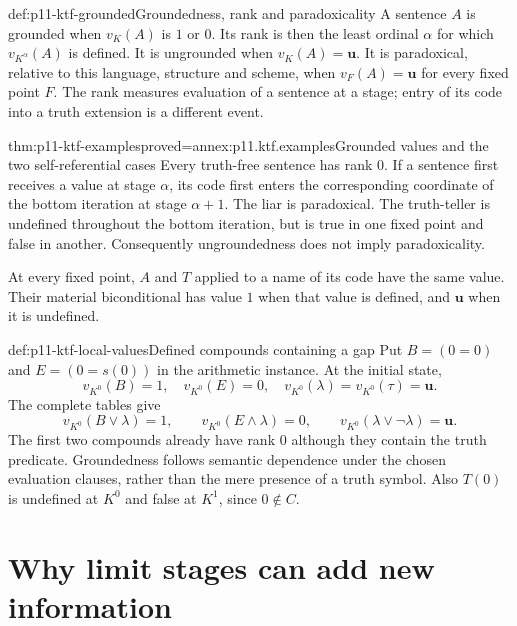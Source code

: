 \begin{hbdefinition}{def:p11-ktf-grounded}{Groundedness, rank and paradoxicality}
A sentence \(A\) is grounded when \(v_K(A)\) is \(1\) or \(0\).
Its rank is then the least ordinal \(\alpha\) for which
\(v_{K^\alpha}(A)\) is defined. It is ungrounded when
\(v_K(A)=\mathbf u\). It is paradoxical, relative to this language,
structure and scheme, when \(v_F(A)=\mathbf u\) for every fixed point
\(F\). The rank measures evaluation of a sentence at a stage; entry of
its code into a truth extension is a different event.
\end{hbdefinition}

\begin{hbtheorem}{thm:p11-ktf-examples}{proved=annex:p11.ktf.examples}{Grounded values and the two self-referential cases}
Every truth-free sentence has rank \(0\). If a sentence first receives a
value at stage \(\alpha\), its code first enters the corresponding
coordinate of the bottom iteration at stage \(\alpha+1\).
The liar is paradoxical. The truth-teller is undefined throughout the
bottom iteration, but is true in one fixed point and false in another.
Consequently ungroundedness does not imply paradoxicality.

At every fixed point, \(A\) and \(T\) applied to a name of its code
have the same value. Their material biconditional has value \(1\) when
that value is defined, and \(\mathbf u\) when it is undefined.
\end{hbtheorem}

\begin{hbexample}{def:p11-ktf-local-values}{Defined compounds containing a gap}
Put \(B=(0=0)\) and \(E=(0=s(0))\) in the arithmetic instance.
At the initial state,
\[
 v_{K^0}(B)=1,\quad v_{K^0}(E)=0,\quad
 v_{K^0}(\lambda)=v_{K^0}(\tau)=\mathbf u.
\]
The complete tables give
\[
 v_{K^0}(B\lor\lambda)=1,\qquad
 v_{K^0}(E\land\lambda)=0,\qquad
 v_{K^0}(\lambda\lor\neg\lambda)=\mathbf u.
\]
The first two compounds already have rank \(0\) although they contain
the truth predicate. Groundedness follows semantic dependence under the
chosen evaluation clauses, rather than the mere presence of a truth symbol.
Also \(T(0)\) is undefined at \(K^0\) and false at \(K^1\), since
\(0\notin C\).
\end{hbexample}

\section{Why limit stages can add new information}

